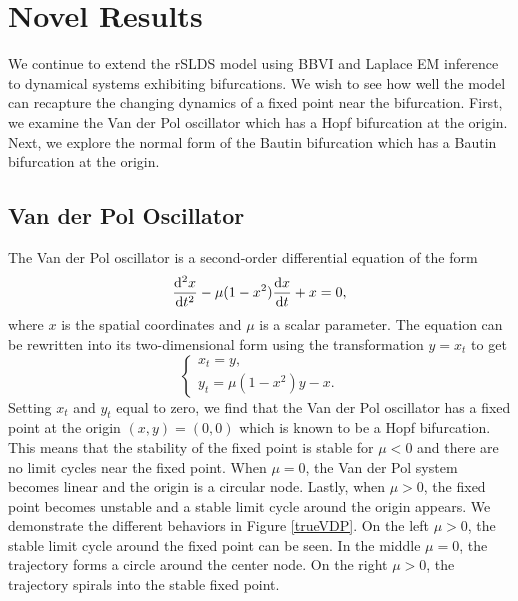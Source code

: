 \section{Novel Results}
We continue to extend the rSLDS model using BBVI and Laplace EM inference to dynamical systems exhibiting bifurcations. We wish to see how well the model can recapture the changing dynamics of a fixed point near the bifurcation. First, we examine the Van der Pol oscillator which has a Hopf bifurcation at the origin. Next, we explore the normal form of the Bautin bifurcation which has a Bautin bifurcation at the origin.  

\subsection{Van der Pol Oscillator}
The Van der Pol oscillator is a second-order differential equation of the form
\[
    \frac{{\mathrm{d}}^2 x}{{\mathrm{d}} t^2} - \mu(1 - x^2)\frac{{\mathrm{d}} x}{{\mathrm{d}} t} + x = 0,
\]
where $x$ is the spatial coordinates and $\mu$ is a scalar parameter. The equation can be rewritten into its two-dimensional form using the transformation $y = x_t$ to get
\[
    \begin{cases}
        x_t = y,\\
        y_t = \mu(1-x^2)y - x.
    \end{cases}
\]
Setting $x_t$ and $y_t$ equal to zero, we find that the Van der Pol oscillator has a fixed point at the origin $(x,y) = (0,0)$ which is known to be a Hopf bifurcation. This means that the stability of the fixed point is stable for $\mu < 0$ and there are no limit cycles near the fixed point. When $\mu = 0$, the Van der Pol system becomes linear and the origin is a circular node. Lastly, when $\mu > 0$, the fixed point becomes unstable and a stable limit cycle around the origin appears. We demonstrate the different behaviors in Figure \ref{trueVDP}. On the left $\mu > 0$, the stable limit cycle around the fixed point can be seen. In the middle $\mu =0$, the trajectory forms a circle around the center node. On the right $\mu > 0$, the trajectory spirals into the stable fixed point. 

